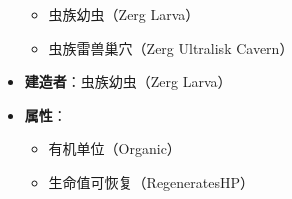 \begin{tcolorbox}[colback=white, colframe=black!60!white, title=Zerg\_Ultralisk(), arc=0mm]
\begin{itemize}
\begin{itemize}
                \item 虫族幼虫（Zerg Larva）
                \item 虫族雷兽巢穴（Zerg Ultralisk Cavern）
            \end{itemize}
        \item \textbf{建造者}：虫族幼虫（Zerg Larva）
        \item \textbf{属性}：
            \begin{itemize}
                \item 有机单位（Organic）
                \item 生命值可恢复（RegeneratesHP）
            \end{itemize}
    \end{itemize}
\end{tcolorbox}

